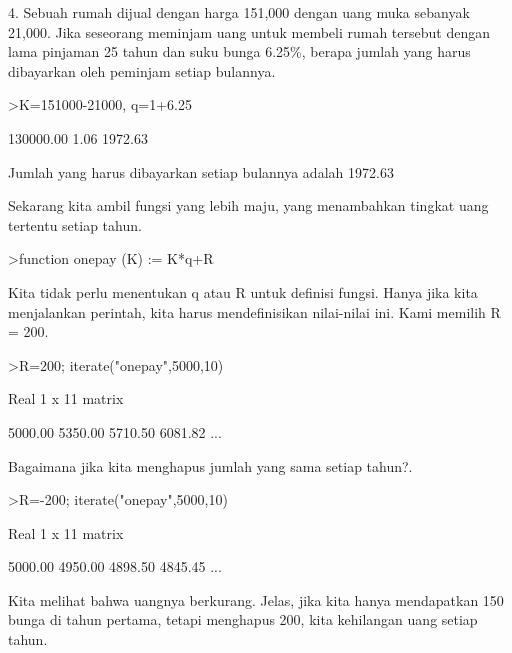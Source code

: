 \documentclass{article}
\begin{document}
\begin{eulernotebook}
\begin{eulercomment}
4. Sebuah rumah dijual dengan harga \textdollar{}151,000 dengan uang muka sebanyak
\textdollar{}21,000. Jika seseorang meminjam uang untuk membeli rumah tersebut
dengan lama pinjaman 25 tahun dan suku bunga 6.25\%, berapa jumlah yang
harus dibayarkan oleh peminjam setiap bulannya.
\end{eulercomment}
\begin{eulerprompt}
>K=151000-21000, q=1+6.25%
\end{eulerprompt}
\begin{euleroutput}
    130000.00 
         1.06 
      1972.63 
\end{euleroutput}
\begin{eulercomment}
Jumlah yang harus dibayarkan setiap bulannya adalah \textdollar{}1972.63

\begin{eulercomment}
\begin{eulercomment}
Sekarang kita ambil fungsi yang lebih maju, yang menambahkan tingkat
uang tertentu setiap tahun.
\end{eulercomment}
\begin{eulerprompt}
>function onepay (K) := K*q+R
\end{eulerprompt}
\begin{eulercomment}
Kita tidak perlu menentukan q atau R untuk definisi fungsi. Hanya jika
kita menjalankan perintah, kita harus mendefinisikan nilai-nilai ini.
Kami memilih R = 200.
\end{eulercomment}
\begin{eulerprompt}
>R=200; iterate("onepay",5000,10)
\end{eulerprompt}
\begin{euleroutput}
  Real 1 x 11 matrix
  
      5000.00     5350.00     5710.50     6081.82     ...
\end{euleroutput}
\begin{eulercomment}
Bagaimana jika kita menghapus jumlah yang sama setiap tahun?.
\end{eulercomment}
\begin{eulerprompt}
>R=-200; iterate("onepay",5000,10)
\end{eulerprompt}
\begin{euleroutput}
  Real 1 x 11 matrix
  
      5000.00     4950.00     4898.50     4845.45     ...
\end{euleroutput}
\begin{eulercomment}
Kita melihat bahwa uangnya berkurang. Jelas, jika kita hanya
mendapatkan 150 bunga di tahun pertama, tetapi menghapus 200, kita
kehilangan uang setiap tahun.



\end{eulercomment}
\end{eulercomment}
\end{eulercomment}
\end{eulernotebook}
\end{document}
